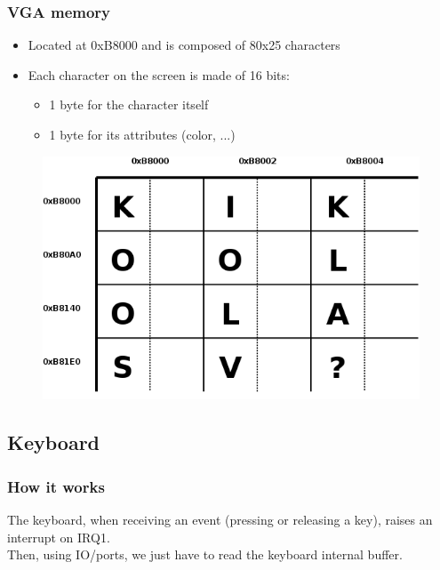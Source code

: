 \documentclass{beamer}
\begin{document}
\begin{frame}
  \frametitle{VGA memory}

  \begin{itemize}
  \item
    Located at 0xB8000 and is composed of 80x25 characters
  \item
    Each character on the screen is made of 16 bits:
    \begin{itemize}
    \item
      1 byte for the character itself
    \item
      1 byte for its attributes (color, ...)
    \end{itemize}
  \end{itemize}
  \begin{figure}
  \includegraphics[scale=0.25]{vga.png}
  \end{figure}
\end{frame}

\subsection{Keyboard}

\begin{frame}
  \frametitle{How it works}

  The keyboard, when receiving an event (pressing or releasing a key), raises an interrupt on IRQ1.\\
  Then, using IO/ports, we just have to read the keyboard internal buffer.
\end{frame}
\end{document}
